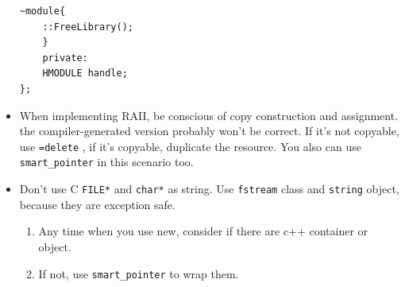 \documentclass[a4paper,11pt,twoside]{book}
\begin{document}
\begin{itemize}
\begin{lstlisting}[numbers=none]
	~module{
	::FreeLibrary();
	}
	private:
	HMODULE handle;
};
\end{lstlisting}

	\item When implementing RAII, be conscious of copy construction and assignment. the compiler-generated version probably won't be correct. If it's not copyable, use \texttt{=delete} , if it's copyable, duplicate the resource.  You also can use \texttt{smart\_pointer} in this scenario too.
	

	\item Don't use C \texttt{FILE*} and \texttt{char*} as string. Use \texttt{fstream} class and \texttt{string} object, because they are exception safe.
	\begin{enumerate}
		\item Any time when you use new, consider if there are c++ container or object.
		\item If not, use \texttt{smart\_pointer} to wrap them.
	\end{enumerate}
	
\end{itemize}
\end{document}
